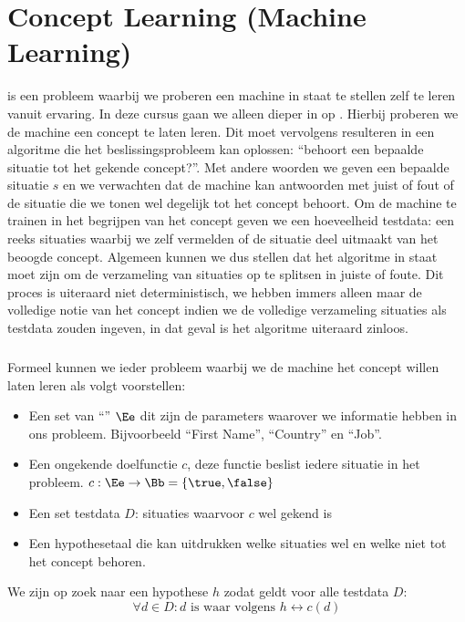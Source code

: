 \chapter{Concept Learning (Machine Learning)}
\label{s:conceptLearning}
 is een probleem waarbij we proberen een machine in staat te stellen zelf te leren vanuit ervaring. In deze cursus gaan we alleen dieper in op . Hierbij proberen we de machine een concept te laten leren. Dit moet vervolgens resulteren in een algoritme die het beslissingsprobleem kan oplossen: ``behoort een bepaalde situatie tot het gekende concept?''. Met andere woorden we geven een bepaalde situatie $s$ en we verwachten dat de machine kan antwoorden met juist of fout of de situatie die we tonen wel degelijk tot het concept behoort. Om de machine te trainen in het begrijpen van het concept geven we een hoeveelheid testdata: een reeks situaties waarbij we zelf vermelden of de situatie deel uitmaakt van het beoogde concept. Algemeen kunnen we dus stellen dat het algoritme in staat moet zijn om de verzameling van situaties op te splitsen in juiste of foute. Dit proces is uiteraard niet deterministisch, we hebben immers alleen maar de volledige notie van het concept indien we de volledige verzameling situaties als testdata zouden ingeven, in dat geval is het algoritme uiteraard zinloos.
\paragraph{}
Formeel kunnen we ieder probleem waarbij we de machine het concept willen laten leren als volgt voorstellen:
\begin{itemize}
 \item Een set van ``'' $\Ee$ dit zijn de parameters waarover we informatie hebben in ons probleem. Bijvoorbeeld ``First Name'', ``Country'' en ``Job''.
 \item Een ongekende doelfunctie $c$, deze functie beslist iedere situatie in het probleem. $c:\Ee\rightarrow\Bb=\left\{\true,\false\right\}$
 \item Een set testdata $D$: situaties waarvoor $c$ wel gekend is
 \item Een hypothesetaal die kan uitdrukken welke situaties wel en welke niet tot het concept behoren.
\end{itemize}
We zijn op zoek naar een hypothese $h$ zodat geldt voor alle testdata $D$:
\begin{equation}
\forall d\in D:d\mbox{ is waar volgens } h\leftrightarrow c\left(d\right)
\end{equation}
